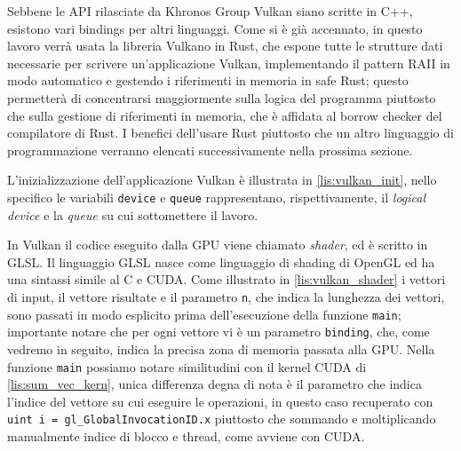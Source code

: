 Sebbene le API rilasciate da Khronos Group Vulkan  siano scritte in C++, esistono vari bindings per altri linguaggi. Come si è già accennato, in questo lavoro verrà usata la libreria Vulkano \cite[]{github:Vulkano} in Rust, che espone tutte le strutture dati necessarie per scrivere un'applicazione Vulkan, implementando il pattern \gls{RAII} in modo automatico e gestendo i riferimenti in memoria in safe Rust; questo permetterà di concentrarsi maggiormente sulla logica del programma piuttosto che sulla gestione di riferimenti in memoria, che è affidata al borrow checker \cite[]{Rust:borrow_checker} del compilatore di Rust. I benefici dell'usare Rust piuttosto che un altro linguaggio di programmazione verranno elencati successivamente nella prossima sezione.

\vspace{5mm}
 
\vspace{5mm}

L'inizializzazione dell'applicazione Vulkan è illustrata in \ref{lis:vulkan_init}, nello specifico le variabili \verb|device| e \verb|queue| rappresentano, rispettivamente, il \textit{logical device} e la \textit{queue} su cui sottomettere il lavoro. 

In Vulkan il codice eseguito dalla GPU viene chiamato \textit{shader}, ed è scritto in \gls{GLSL}. Il linguaggio GLSL nasce come linguaggio di shading di OpenGL ed ha una sintassi simile al C e CUDA. Come illustrato in \ref{lis:vulkan_shader} i vettori di input, il vettore risultate e il parametro \verb|n|, che indica la lunghezza dei vettori, sono passati in modo esplicito prima dell'esecuzione della funzione \verb|main|; importante notare che per ogni vettore vi è un parametro \verb|binding|, che, come vedremo in seguito, indica la precisa zona di memoria passata alla GPU. Nella funzione \verb|main| possiamo notare similitudini con il kernel CUDA di \ref{lis:sum_vec_kern}, unica differenza degna di nota è il parametro che indica l'indice del vettore su cui eseguire le operazioni, in questo caso recuperato con \verb|uint i = gl_GlobalInvocationID.x| piuttosto che sommando e moltiplicando manualmente indice di blocco e thread, come avviene con CUDA.

